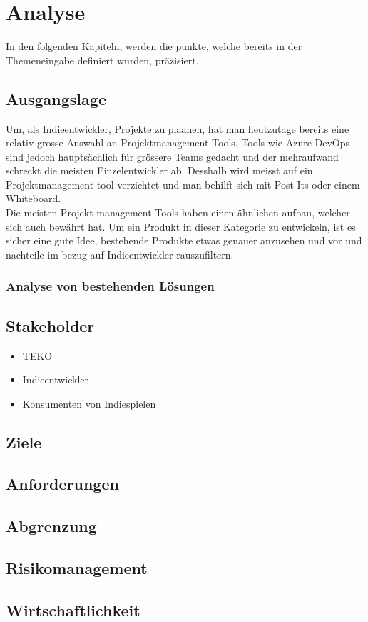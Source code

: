 \section{Analyse}
In den folgenden Kapiteln, werden die punkte, welche bereits in der Themeneingabe
definiert wurden, präzisiert.

\subsection{Ausgangslage}
Um, als Indieentwickler, Projekte zu plaanen, hat man heutzutage bereits eine relativ grosse Auswahl an
Projektmanagement Tools.
Tools wie Azure DevOps sind jedoch hauptsächlich für grössere Teams gedacht und der mehraufwand schreckt die meisten Einzelentwickler ab.
Desshalb wird meisst auf ein Projektmanagement tool verzichtet und man behilft sich mit Post-Its oder einem Whiteboard.\\
Die meisten Projekt management Tools haben einen ähnlichen aufbau, welcher sich auch bewährt hat.
Um ein Produkt in dieser Kategorie zu entwickeln, ist es sicher eine gute Idee, bestehende Produkte etwas genauer anzusehen und vor und nachteile 
im bezug auf Indieentwickler rauszufiltern.

\subsubsection{Analyse von bestehenden Lösungen}


\newpage


\newpage
\subsection{Stakeholder}
\begin{itemize}
    \item TEKO
    \item Indieentwickler
    \item Konsumenten von Indiespielen
\end{itemize}
\newpage
\subsection{Ziele}
\newpage
\subsection{Anforderungen}
\newpage
\subsection{Abgrenzung}
\newpage
\subsection{Risikomanagement}
\newpage
\subsection{Wirtschaftlichkeit}